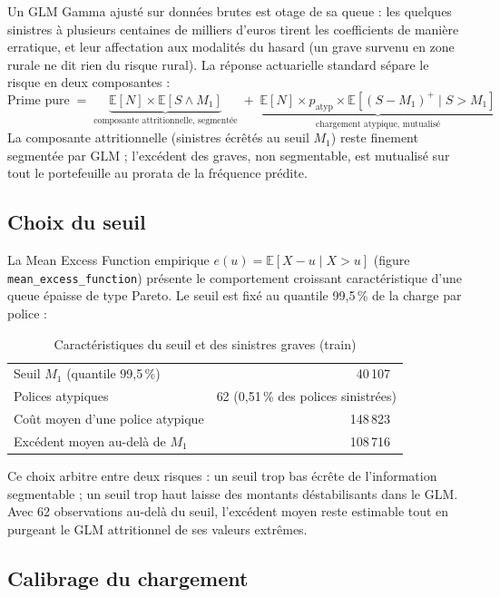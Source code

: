 \documentclass[11pt,a4paper]{article}
\newcommand{\eur}{\texteuro}
\begin{document}
Un GLM Gamma ajusté sur données brutes est otage de sa queue : les quelques sinistres à plusieurs centaines de milliers d'euros tirent les coefficients de manière erratique, et leur affectation aux modalités du hasard (un grave survenu en zone rurale ne dit rien du risque rural). La réponse actuarielle standard sépare le risque en deux composantes :
\begin{equation}
    \text{Prime pure} \;=\;
    \underbrace{\mathbb{E}[N] \times \mathbb{E}[S \wedge M_1]}_{\text{composante attritionnelle, segmentée}}
    \;+\;
    \underbrace{\mathbb{E}[N] \times p_{\text{atyp}} \times \mathbb{E}[(S - M_1)^+ \mid S > M_1]}_{\text{chargement atypique, mutualisé}}
\end{equation}
La composante attritionnelle (sinistres écrêtés au seuil $M_1$) reste finement segmentée par GLM ; l'excédent des graves, non segmentable, est mutualisé sur tout le portefeuille au prorata de la fréquence prédite.

\subsection{Choix du seuil}

La Mean Excess Function empirique $e(u) = \mathbb{E}[X - u \mid X > u]$ (figure \texttt{mean\_excess\_function}) présente le comportement croissant caractéristique d'une queue épaisse de type Pareto. Le seuil est fixé au quantile 99{,}5\,\% de la charge par police :
\begin{table}[H]
\centering
\caption{Caractéristiques du seuil et des sinistres graves (train)}
\begin{tabular}{lr}
\toprule
Seuil $M_1$ (quantile 99{,}5\,\%) & 40\,107~\eur \\
Polices atypiques & 62 (0{,}51\,\% des polices sinistrées) \\
Coût moyen d'une police atypique & 148\,823~\eur \\
Excédent moyen au-delà de $M_1$ & 108\,716~\eur \\
\bottomrule
\end{tabular}
\end{table}

Ce choix arbitre entre deux risques : un seuil trop bas écrête de l'information segmentable ; un seuil trop haut laisse des montants déstabilisants dans le GLM. Avec 62 observations au-delà du seuil, l'excédent moyen reste estimable tout en purgeant le GLM attritionnel de ses valeurs extrêmes.

\subsection{Calibrage du chargement}
\end{document}
